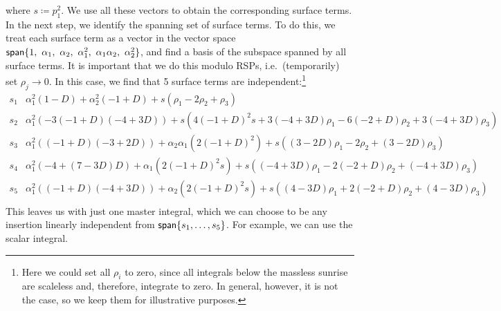 where $s\coloneqq p_1^2$.
We use all these vectors to obtain the corresponding surface terms. 
In the next step, we identify the spanning set of surface terms.
To do this, we treat each surface term as a vector in the vector space 
$\mathsf{span}\{1,~ \alpha_1,~ \alpha_2,~\alpha_1^2,~\alpha_1\alpha_2,~\alpha_2^2\}$,
and find a basis of the subspace spanned by all surface terms. 
It is important that we do this modulo RSPs, i.e.\ (temporarily) set $\rho_j\to 0$.
In this case, we find that 5 surface terms are independent:\footnote{
  Here we could set all $\rho_i$ to zero, since all integrals below the massless sunrise are scaleless and, therefore, integrate to zero.
  In general, however, it is not the case, so we keep them for illustrative purposes.
}
{
  \small
  \begin{equation*}
    \begin{array}{l|l}
      s_1 & \alpha _1^2 (1-D)+\alpha _2^2 (-1+D)+s \left(\rho _1-2 \rho _2+\rho _3\right) \\
      s_2 & \alpha _1^2 (-3 (-1+D) (-4+3 D))+s \left(4 (-1+D)^2 s+3 (-4+3 D) \rho _1-6 (-2+D) \rho _2+3 (-4+3 D) \rho _3\right) \\
      s_3 & \alpha _1^2 ((-1+D) (-3+2 D))+\alpha _2 \alpha _1 \left(2 (-1+D)^2\right)+s \left((3-2 D) \rho _1-2 \rho _2+(3-2 D) \rho _3\right) \\
      s_4 & \alpha _1^2 (-4+(7-3 D) D)+\alpha _1 \left(2 (-1+D)^2 s\right)+s \left((-4+3 D) \rho _1-2 (-2+D) \rho _2+(-4+3 D) \rho _3\right) \\
      s_5 & \alpha _1^2 ((-1+D) (-4+3 D))+\alpha _2 \left(2 (-1+D)^2 s\right)+s \left((4-3 D) \rho _1+2 (-2+D) \rho _2+(4-3 D) \rho _3\right) \\
    \end{array}
  \end{equation*}
}
This leaves us with just one master integral, which
we can choose to be any insertion linearly independent from $\mathsf{span}\{s_1,\ldots{},s_5\}$.
For example, we can use the scalar integral.






